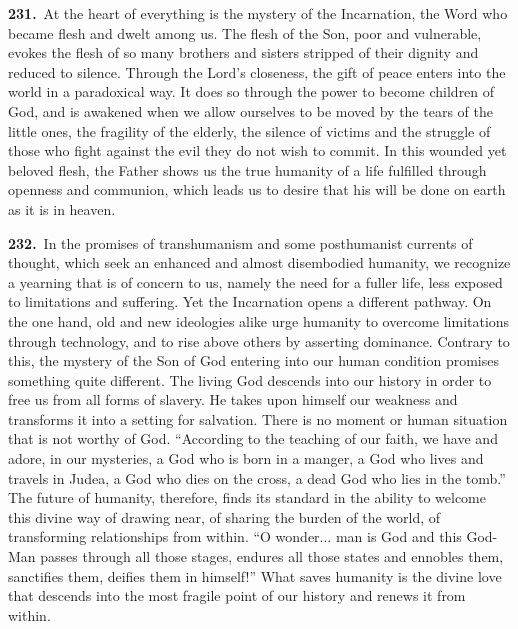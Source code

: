 \documentclass{article}
\begin{document}
\textbf{231.}\ At the heart of everything is the mystery of the Incarnation, the Word who became flesh and dwelt among us. The flesh of the Son, poor and vulnerable, evokes the flesh of so many brothers and sisters stripped of their dignity and reduced to silence.\cite{n206} Through the Lord's closeness, the gift of peace enters into the world in a paradoxical way. It does so through the power to become children of God, and is awakened when we allow ourselves to be moved by the tears of the little ones, the fragility of the elderly, the silence of victims and the struggle of those who fight against the evil they do not wish to commit.\cite{n207} In this wounded yet beloved flesh, the Father shows us the true humanity of a life fulfilled through openness and communion, which leads us to desire that his will be done on earth as it is in heaven.\cite{n208}

\textbf{232.}\ In the promises of transhumanism and some posthumanist currents of thought, which seek an enhanced and almost disembodied humanity, we recognize a yearning that is of concern to us, namely the need for a fuller life, less exposed to limitations and suffering. Yet the Incarnation opens a different pathway. On the one hand, old and new ideologies alike urge humanity to overcome limitations through technology, and to rise above others by asserting dominance. Contrary to this, the mystery of the Son of God entering into our human condition promises something quite different. The living God descends into our history in order to free us from all forms of slavery.\cite{n209} He takes upon himself our weakness and transforms it into a setting for salvation. There is no moment or human situation that is not worthy of God. ``According to the teaching of our faith, we have and adore, in our mysteries, a God who is born in a manger, a God who lives and travels in Judea, a God who dies on the cross, a dead God who lies in the tomb.''\cite{n210} The future of humanity, therefore, finds its standard in the ability to welcome this divine way of drawing near, of sharing the burden of the world, of transforming relationships from within. ``O wonder... man is God and this God-Man passes through all those stages, endures all those states and ennobles them, sanctifies them, deifies them in himself!''\cite{n211} What saves humanity is the divine love that descends into the most fragile point of our history and renews it from within.
\end{document}
